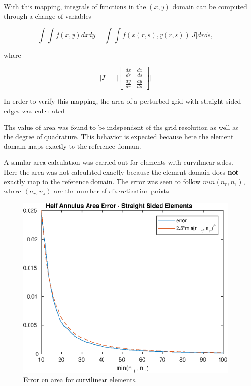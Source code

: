 \documentclass{article}
\begin{document}
\noindent With this mapping, integrals of functions in the $(x,y)$ domain can be computed through a change of variables

\begin{equation}
\int \int f(x,y) dx dy = \int \int f(x(r,s), y(r,s)) |J| dr ds,
\end{equation} 

\noindent where

\begin{equation*}
|J| =    \lvert \begin{bmatrix}
      \frac{dx}{dr} & \frac{dx}{ds}\\
      \frac{dy}{dr} & \frac{dy}{ds}
    \end{bmatrix} \rvert
\end{equation*}

In order to verify this mapping, the area of a perturbed grid with straight-sided edges was calculated. 

The value of area was found to be independent of the grid resolution as well as the degree of quadrature. This behavior is expected because here the element domain maps exactly to the reference domain.

  

A similar area calculation was carried out for elements with curvilinear sides. Here the area was not calculated exactly because the element domain does \textbf{not} exactly map to the reference domain. The error was seen to follow $min(n_r,n_s)$, where $(n_r, n_s)$ are the number of discretization points.

\begin{figure}[H]
  \centering
  \includegraphics[scale=0.7]{media/5-3-error.eps}
  
  \caption{Error on area for curvilinear elements.}
  \label{fig:ref2}
\end{figure}
\end{document}

